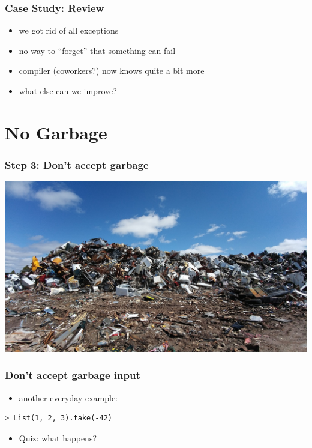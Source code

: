 \documentclass{beamer}
\begin{document}
\begin{frame}
  \frametitle{Case Study: Review}
  \begin{itemize}
  \item we got rid of all exceptions
  \item no way to ``forget'' that something can fail
  \item compiler (coworkers?) now knows quite a bit more
  \item what else can we improve?
  \end{itemize}
\end{frame}

\section{No Garbage}

\begin{frame}
  \frametitle{Step 3: Don't accept garbage}
  \includegraphics[width=\textwidth]{../pics/scrapyard-2441432_1280.jpg}
\end{frame}

\begin{frame}
  \frametitle{Don't accept garbage input}
  \begin{itemize}
  \item another everyday example:
  \end{itemize}
  \begin{center}
\begin{verbatim}
> List(1, 2, 3).take(-42)
\end{verbatim}
  \end{center}
  \begin{itemize}
  \item Quiz: what happens?
  \end{itemize}
\end{frame}
\end{document}
